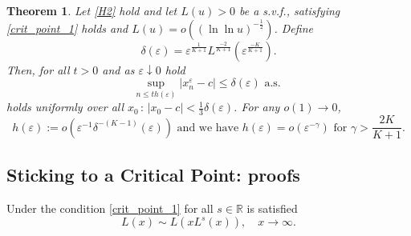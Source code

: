 \documentclass{article}
\theoremstyle{plain}
\newtheorem{theorem}{Theorem}[section]
\theoremstyle{definition}
\theoremstyle{remark}
\newcommand{\ra }{ \rightarrow} %
\begin{document}
\begin{theorem}\label{th2_crit_point}
    Let \ref{H2} hold and let $L(u) > 0$ be a s.v.f., satisfying \eqref{crit_point_1} holds and $L(u) = o\left( (\ln \ln u)^{-\frac{1}{2}}\right)$.  Define
    \begin{equation*}
        \delta(\varepsilon) = 
        \varepsilon^{\frac{1}{K+1}} L^{\frac{-2}{K +1}}\left(\varepsilon^{\frac{-K}{K+1}} \right).
    \end{equation*}
    Then, for all $t >0$ and as $\varepsilon\downarrow 0$ hold
    \begin{equation*}
        \sup\limits_{n \leqslant t h(\varepsilon)}|x^{\varepsilon}_{n} - c| \leqslant \delta(\varepsilon) \text{ a.s. }
    \end{equation*}
    holds uniformly over all $x_0 \,:\, |x_0 - c|< \frac{1}{3} \delta(\varepsilon)$. For any $o(1) \ra 0$,
    \begin{equation*}
         h(\varepsilon):= o\left(\varepsilon^{ - 1} \delta^{- (K-1)}(\varepsilon)\right)  \text{ and we have } h(\varepsilon) = o\left(   \varepsilon^{-\gamma}\right) \text{ for }   \gamma > \frac{2K}{K+1}.
    \end{equation*}
\end{theorem}

\subsection{Sticking to a Critical Point: proofs }


Under the condition \eqref{crit_point_1} for all $s \in \mathbb{R}$ is satisfied
\begin{equation}\label{crit_point_2}
    L(x) \sim L(xL^s(x)), \quad x \ra \infty. 
\end{equation}
\end{document}
